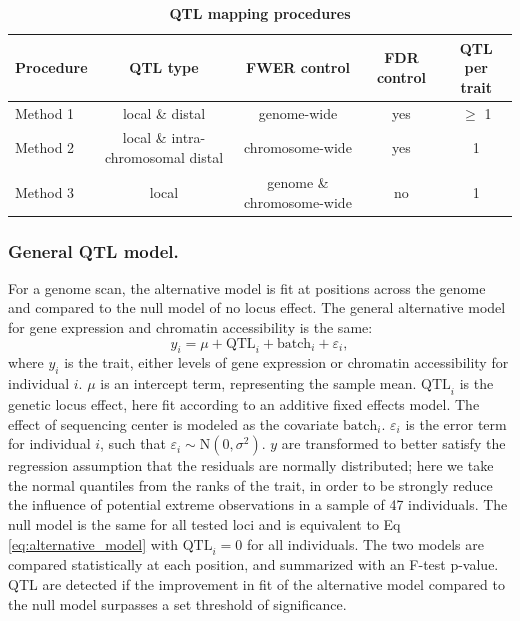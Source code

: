 \begin{table}[h]
\renewcommand{\familydefault}{\sfdefault}\normalfont
\begin{tableminipage}{\textwidth}
\captionsetup{width=\textwidth}
\centering
\caption{\bf QTL mapping procedures
\label{tab:qtl_procedures}}
\end{tableminipage}
\begin{tableminipage}{\textwidth}
\begin{tabularx}{\textwidth}{l | cccc}
\hline 
Procedure & QTL type & FWER control & FDR control & QTL per trait \\
\hline
Method 1 & local \& distal & genome-wide & yes & $\ge$ 1 \\
Method 2 & local \& intra-chromosomal distal & chromosome-wide & yes & 1 \\
Method 3 & local & genome \& chromosome-wide & no & 1 \\
\hline
\end{tabularx}
\end{tableminipage}
\end{table}

\subsubsection{General QTL model.}
For a genome scan, the alternative model is fit at positions across the genome and compared to the null model of no locus effect. The general alternative model for gene expression and chromatin accessibility is the same: 
\begin{equation}
y_{i} = \mu + \text{QTL}_{i} + \text{batch}_{i} + \varepsilon_{i},
\label{eq:alternative_model}
\end{equation}
where $y_{i}$ is the trait, either levels of gene expression or chromatin accessibility for individual $i$. $\mu$ is an intercept term, representing the sample mean. $\text{QTL}_{i}$ is the genetic locus effect, here fit according to an additive fixed effects model. The effect of sequencing center is modeled as the covariate $\text{batch}_{i}$. $\varepsilon_{i}$ is the error term for individual $i$, such that $\varepsilon_{i} \sim \text{N}(0, \sigma^{2})$. $y$ are transformed to better satisfy the regression assumption that the residuals are normally distributed; here we take the normal quantiles from the ranks of the trait, in order to be strongly reduce the influence of potential extreme observations in a sample of 47 individuals. The null model is the same for all tested loci and is equivalent to Eq \ref{eq:alternative_model} with $\text{QTL}_{i} = 0$ for all individuals. The two models are compared statistically at each position, and summarized with an F-test p-value. QTL are detected if the improvement in fit of the alternative model compared to the null model surpasses a set threshold of significance.

